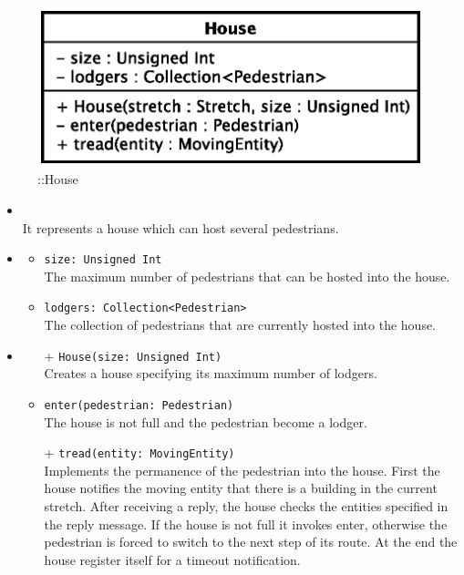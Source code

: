 \begin{figure}[h]
\centering
\includegraphics[scale=0.6,keepaspectratio]{images/solution/house.eps}
\caption{\pReactiveComponentStretchDecoration::House}
\label{fig:sd-app-house}
\end{figure}
\FloatBarrier
\begin{itemize}
  \item \textbf{\descr} \\
    It represents a house which can host several pedestrians.
  \item \textbf{\attrs}
  \begin{itemize}
    \item \texttt{size: Unsigned Int} \\
The maximum number of pedestrians that can be hosted into the house.
    \item \texttt{lodgers: Collection<Pedestrian>} \\
The collection of pedestrians that are currently hosted into the house.
  \end{itemize}
  \item \textbf{\ops}
  \begin{itemize} 
   \item[+] \texttt{House(size: Unsigned Int)} \\
Creates a house specifying its maximum number of lodgers.
    \item \texttt{enter(pedestrian: Pedestrian)} \\
The house is not full and the pedestrian become a lodger.   
\item[+] \texttt{tread(entity: MovingEntity)} \\
Implements the permanence of the pedestrian into the house. First the house notifies the moving entity that there is a building in the current stretch. After receiving a reply, the house checks the entities specified in the reply message. If the house is not full it invokes enter, otherwise the pedestrian is forced to switch to the next step of its route. At the end the house register itself for a timeout notification.
  \end{itemize}
\end{itemize}
